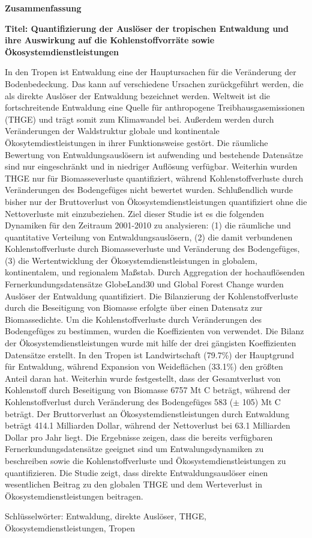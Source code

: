 \thispagestyle{empty}

\begin{de}
	\begin{center}
		\textbf{Zusammenfassung}
	\end{center}
	\textbf{Titel: Quantifizierung der Auslöser der tropischen Entwaldung und ihre Auswirkung auf die Kohlenstoffvorräte sowie Ökosystemdienstleistungen}

	In den Tropen ist Entwaldung eine der Hauptursachen für die Veränderung der Bodenbedeckung. Das kann auf verschiedene Ursachen zurückgeführt werden, die als direkte Auslöser der Entwaldung bezeichnet werden. Weltweit ist die fortschreitende Entwaldung eine Quelle für anthropogene Treibhausgasemissionen (THGE) und trägt somit zum Klimawandel bei. Außerdem werden durch Veränderungen der Waldstruktur globale und kontinentale Ökosytemdiestleistungen in ihrer Funktionsweise  gestört. Die räumliche Bewertung von Entwaldungsauslösern ist aufwending und bestehende Datensätze sind nur eingeschränkt und in niedriger Auflösung verfügbar. Weiterhin wurden THGE nur für Biomasseverluste quantifiziert, während Kohlenstoffverluste durch Veränderungen des Bodengefüges nicht bewertet wurden. Schlußendlich wurde bisher nur der Bruttoverlust von Ökosystemdienstleistungen quantifiziert ohne die Nettoverluste mit einzubeziehen. Ziel dieser Studie ist es die folgenden Dynamiken für den Zeitraum 2001-2010 zu analysieren: (1) die räumliche und quantitative Verteilung von Entwaldungsauslösern, (2) die damit verbundenen Kohlenstoffverluste durch Biomasseverluste und Veränderung des Bodengefüges, (3) die Wertentwicklung der Ökosystemdienstleistungen in globalem, kontinentalem, und regionalem Maßstab. Durch Aggregation der hochauflösenden Fernerkundungsdatensätze GlobeLand30 und Global Forest Change wurden Auslöser der Entwaldung quantifiziert. Die Bilanzierung der Kohlenstoffverluste durch die Beseitigung von Biomasse erfolgte über einen Datensatz zur Biomassedichte. Um die Kohlenstoffverluste durch Veränderungen des Bodengefüges zu bestimmen, wurden die Koeffizienten von \citet{Don2010} verwendet. Die Bilanz der Ökosystemdienstleistungen wurde mit hilfe der drei gängisten Koeffizienten Datensätze erstellt. In den Tropen ist Landwirtschaft (79.7\%) der Hauptgrund für Entwaldung, während Expansion von Weideflächen (33.1\%) den größten Anteil daran hat. Weiterhin wurde festgestellt, dass der Gesamtverlust von Kohlenstoff durch Beseitigung von Biomasse 6757 Mt C beträgt, während der Kohlenstoffverlust durch Veränderung des Bodengefüges 583 ($\pm$ 105) Mt C beträgt. Der Bruttorverlust an Ökosystemdienstleistungen durch Entwaldung beträgt 414.1 Milliarden Dollar, während der Nettoverlust bei 63.1 Milliarden Dollar pro Jahr liegt. Die Ergebnisse zeigen, dass die bereits verfügbaren Fernerkundungsdatensätze geeignet sind um Entwalungsdynamiken zu beschreiben sowie die Kohlenstoffverluste und Ökosystemdienstleistungen zu quantifizieren. Die Studie zeigt, dass direkte Entwaldungsauslöser einen wesentlichen Beitrag zu den globalen THGE und dem Werteverlust in Ökosystemdienstleistungen beitragen.

	Schlüsselwörter: Entwaldung, direkte Auslöser, THGE, Ökosystemdienstleistungen, Tropen
\end{de}